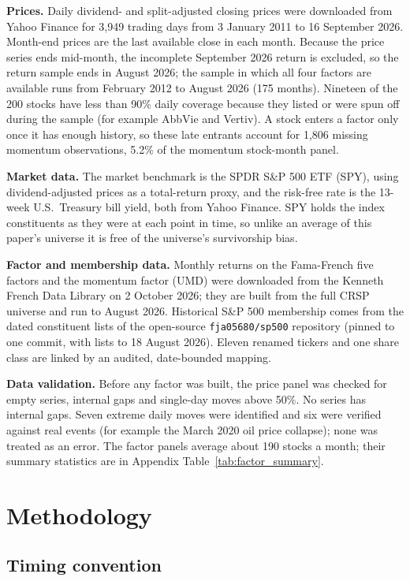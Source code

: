\documentclass[11pt,a4paper]{article}
\begin{document}
\textbf{Prices.} Daily dividend- and split-adjusted closing prices were downloaded from Yahoo Finance for 3,949 trading days from 3 January 2011 to 16 September 2026. Month-end prices are the last available close in each month. Because the price series ends mid-month, the incomplete September 2026 return is excluded, so the return sample ends in August 2026; the sample in which all four factors are available runs from February 2012 to August 2026 (175 months). Nineteen of the 200 stocks have less than 90\% daily coverage because they listed or were spun off during the sample (for example AbbVie and Vertiv). A stock enters a factor only once it has enough history, so these late entrants account for 1,806 missing momentum observations, 5.2\% of the momentum stock-month panel.

\textbf{Market data.} The market benchmark is the SPDR S\&P 500 ETF (SPY), using dividend-adjusted prices as a total-return proxy, and the risk-free rate is the 13-week U.S.\ Treasury bill yield, both from Yahoo Finance. SPY holds the index constituents as they were at each point in time, so unlike an average of this paper's universe it is free of the universe's survivorship bias.

\textbf{Factor and membership data.} Monthly returns on the Fama-French five factors and the momentum factor (UMD) were downloaded from the Kenneth French Data Library on 2 October 2026; they are built from the full CRSP universe and run to August 2026. Historical S\&P 500 membership comes from the dated constituent lists of the open-source \texttt{fja05680/sp500} repository (pinned to one commit, with lists to 18 August 2026). Eleven renamed tickers and one share class are linked by an audited, date-bounded mapping.

\textbf{Data validation.} Before any factor was built, the price panel was checked for empty series, internal gaps and single-day moves above 50\%. No series has internal gaps. Seven extreme daily moves were identified and six were verified against real events (for example the March 2020 oil price collapse); none was treated as an error. The factor panels average about 190 stocks a month; their summary statistics are in Appendix Table~\ref{tab:factor_summary}.

\section{Methodology}
\label{sec:method}

\subsection{Timing convention}
\end{document}
